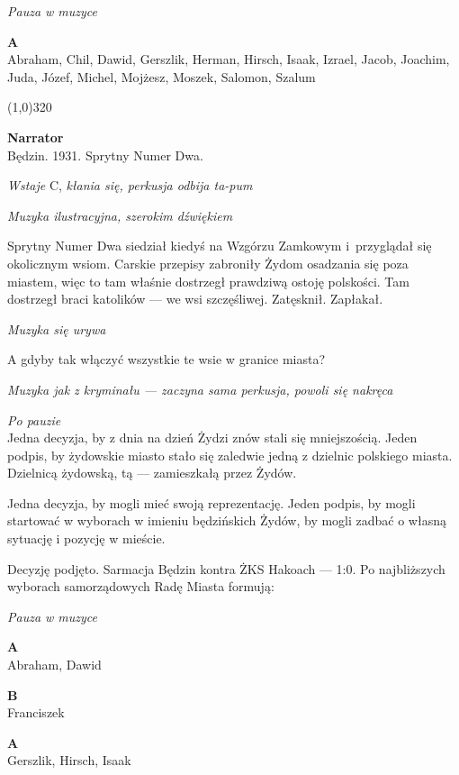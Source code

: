 \documentclass[11pt,a4paper,oneside]{article}
\begin{document}
{\color{light-gray} \emph{Pauza w muzyce}}

\textbf{A}\\
Abraham, Chil, Dawid, Gerszlik, Herman, Hirsch, Isaak, Izrael, Jacob, Joachim, Juda, Józef, Michel, Mojżesz, Moszek, Salomon, Szalum

\line(1,0){320}

 
\textbf{Narrator}\\
Będzin. 1931. Sprytny Numer Dwa. 

{\color{light-gray} \emph{Wstaje} C, \emph{kłania się, perkusja odbija
ta-pum}}

{\color{light-gray} \emph{Muzyka ilustracyjna, szerokim dźwiękiem}}

Sprytny Numer Dwa siedział kiedyś na Wzgórzu Zamkowym i~przyglądał się
okolicznym wsiom. Carskie przepisy zabroniły Żydom osadzania się poza
miastem, więc to tam właśnie dostrzegł prawdziwą ostoję polskości. Tam
dostrzegł braci katolików --- we wsi szczęśliwej. Zatęsknił. Zapłakał.

{\color{light-gray} \emph{Muzyka się urywa}}

A gdyby tak włączyć wszystkie te wsie w granice miasta?

{\color{light-gray} \emph{Muzyka jak z kryminału --- zaczyna sama
perkusja, powoli się nakręca}}

{\color{light-gray} \emph{Po pauzie}}\\
Jedna decyzja, by z dnia na dzień Żydzi znów stali się mniejszością.
Jeden podpis, by żydowskie miasto stało się zaledwie jedną z dzielnic
polskiego miasta.  Dzielnicą żydowską, tą --- zamieszkałą przez Żydów. 

Jedna decyzja, by mogli mieć swoją reprezentację. Jeden podpis, by %
mogli startować w wyborach w imieniu będzińskich Żydów, by mogli
zadbać o własną sytuację i pozycję w mieście. 

Decyzję podjęto. Sarmacja Będzin kontra ŻKS Hakoach --- 1:0. Po
najbliższych wyborach samorządowych Radę Miasta formują:

{\color{light-gray} \emph{Pauza w muzyce}}

\textbf{A}\\
Abraham, Dawid

\textbf{B}\\
Franciszek

\textbf{A}\\
Gerszlik, Hirsch, Isaak
\end{document}
